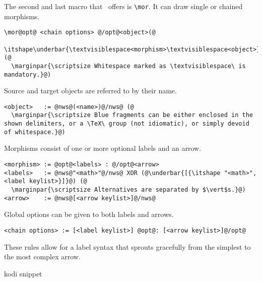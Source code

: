 The second and last macro that \koDi\ offers is \lstinline|\mor|.
It can draw single or chained morphisms.

\begin{lstlisting}
\mor@opt@ <chain options> @/opt@<object>(@
  \itshape\underbar{\textvisiblespace<morphism>\textvisiblespace<object>}@);(@
  \marginpar{\scriptsize Whitespace marked as \textvisiblespace\ is mandatory.}@)
\end{lstlisting}

Source and target objects are referred to by their name.
  
\begin{lstlisting}
<object>   := @nws@(<name>)@/nws@ (@
  \marginpar{\scriptsize Blue fragments can be either enclosed in the shown delimiters, or a \TeX\ group (not idiomatic), or simply devoid of whitespace.}@)
\end{lstlisting}

Morphisms consist of one or more optional labels and an arrow.
  
\begin{lstlisting}
<morphism> := @opt@<labels> : @/opt@<arrow>
<labels>   := @nws@"<math>"@/nws@ XOR (@\underbar{[{\itshape "<math>", <label keylist>}]}@) (@
  \marginpar{\scriptsize Alternatives are separated by $\vert$s.}@)
<arrow>    := @nws@[<arrow keylist>]@/nws@
\end{lstlisting}

Global options can be given to both labels and arrows.

\begin{lstlisting}
<chain options> := [<label keylist>] @opt@: [<arrow keylist>]@/opt@
\end{lstlisting}

These rules allow for a label syntax that sprouts gracefully
from the simplest to the most complex arrow.

\begin{tcblisting}{kodi snippet}
\nilstrut{}
\end{tcblisting}




